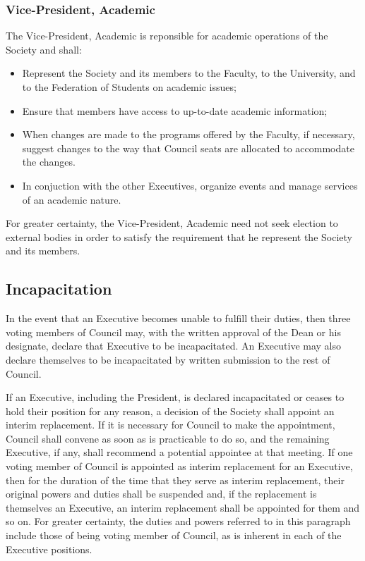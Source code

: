 \subsubsection{Vice-President, Academic}
The Vice-President, Academic is reponsible for academic operations of the
Society and shall:
\begin{itemize}
  \item Represent the Society and its members to the Faculty, to the University,
    and to the Federation of Students on academic issues;
  \item Ensure that members have access to up-to-date academic information;
  \item When changes are made to the programs offered by the Faculty, if
    necessary, suggest changes to the way that Council seats are allocated to
    accommodate the changes.
  \item In conjuction with the other Executives, organize events and manage
    services of an academic nature.
\end{itemize}

For greater certainty, the Vice-President, Academic need not seek election to
external bodies in order to satisfy the requirement that he represent the
Society and its members.

\subsection{Incapacitation}
In the event that an Executive becomes unable to fulfill their duties, then
three voting members of Council may, with the written approval of the Dean or
his designate, declare that Executive to be incapacitated. An Executive may also
declare themselves to be incapacitated by written submission to the rest of
Council.

If an Executive, including the President, is declared incapacitated or ceases to
hold their position for any reason, a decision of the Society shall appoint an
interim replacement. If it is necessary for Council to make the appointment,
Council shall convene as soon as is practicable to do so, and the remaining
Executive, if any, shall recommend a potential appointee at that meeting. If one
voting member of Council is appointed as interim replacement for an Executive,
then for the duration of the time that they serve as interim replacement, their
original powers and duties shall be suspended and, if the replacement is
themselves an Executive, an interim replacement shall be appointed for them and
so on. For greater certainty, the duties and powers referred to in this
paragraph include those of being voting member of Council, as is inherent in
each of the Executive positions.

